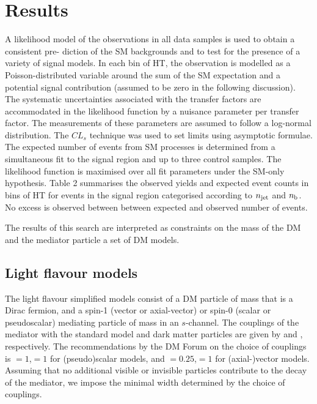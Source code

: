\section{Results} \label{sec:darkmatter}
\clearpage
A likelihood model of the observations in all data samples is used to obtain a consistent pre-
diction of the SM backgrounds and to test for the presence of a variety of signal models.
In each bin of HT, the observation is modelled as a Poisson-distributed variable around the sum
of the SM expectation and a potential signal contribution (assumed to be zero in the following
discussion).  The systematic uncertainties associated with the transfer factors are accommodated 
in the likelihood function by a nuisance parameter per transfer factor. 
The measurements of these parameters are assumed to follow a log-normal
distribution. The $CL_s$ technique was used to set limits using asymptotic formulae.
The expected number of events from SM processes is determined from a simultaneous fit to
the signal region and up to three control samples. The likelihood function is maximised over
all fit parameters under the SM-only hypothesis. Table 2 summarises the observed yields and
expected event counts in bins of HT for events in the signal region categorised according to $n_{\rm jet}$ 
 and $n_{\rm b}$. No excess is observed between between expected and observed number of events.

The results of this search are interpreted as constraints on the mass of the DM and the mediator particle 
a set of DM models.


\subsection{Light flavour models} \label{sec:dm_lightjet}

The light flavour simplified models consist of a DM particle \pchi of mass \mchi that is a Dirac fermion, and a spin-1 (vector or axial-vector) or spin-0
(scalar or pseudoscalar) mediating particle \pphi of mass \mphi in an $s$-channel. The couplings of the mediator with the standard model and dark
matter particles are given by \gsm and \gdm, respectively. The recommendations by the DM Forum on the choice of couplings is \gsm$=1$,\gdm$=1$ for
(pseudo)scalar models, and \gsm$=0.25$,\gdm$=1$ for (axial-)vector models. Assuming that no additional visible or invisible particles contribute to the decay 
of the mediator, we impose the minimal width determined by the choice of couplings.  





